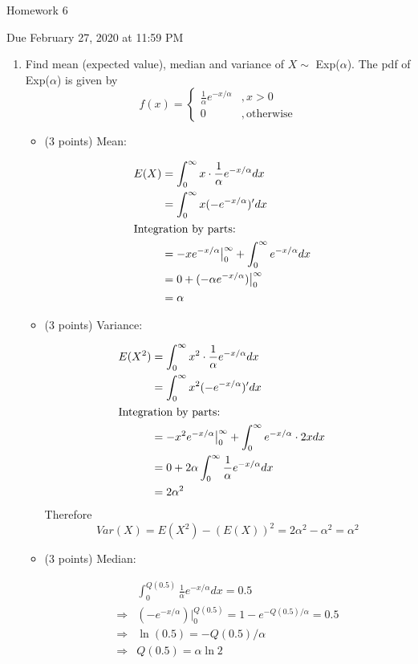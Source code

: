 \documentclass{article}\usepackage[]{graphicx}\usepackage[]{color}
\begin{document}
\begin{center} \LARGE
Homework 6
\end{center}
\begin{center} \Large
Due February 27, 2020 at 11:59 PM 
\end{center}



\begin{enumerate}
	\item  Find mean (expected value), median and variance of $X \sim$ Exp($\alpha$). The pdf of Exp($\alpha$) is given by
	\[f(x) = \begin{cases}
	\frac{1}{\alpha} e^{-x/\alpha}&,x > 0\\
	0 &, \mathrm{otherwise} 
	\end{cases}\]
	
	\begin{itemize}
	\item (3 points) Mean:
	
	\begin{align*}
	E(X) & = \int_{0}^\infty x \cdot \frac{1}{\alpha} e^{-x/\alpha} dx\\
	& = \int_{0}^\infty x (- e^{-x/\alpha})' dx\\
	\intertext{Integration by parts:}
	& = - x e^{-x/\alpha} \big|_0^\infty + \int_{0}^\infty e^{-x/\alpha} dx \quad  \\
	& = 0 + ( - \alpha e^{-x/\alpha})\big|_0^\infty\\
	& = \alpha
	\end{align*}
	
	\item (3 points) Variance:
	
		\begin{align*}
	E(X^2) & = \int_{0}^\infty x^2 \cdot \frac{1}{\alpha} e^{-x/\alpha} dx\\
	& = \int_{0}^\infty x^2 (- e^{-x/\alpha})' dx\\
	\intertext{Integration by parts:}
	& = - x^2 e^{-x/\alpha} \big|_0^\infty + \int_{0}^\infty e^{-x/\alpha} \cdot 2x dx \quad  \\
	& = 0 + 2 \alpha \int_{0}^\infty \frac{1}{\alpha} e^{-x/\alpha} dx\\
	& = 2 \alpha^2
	\end{align*}
	Therefore
	\[Var(X) = E(X^2) - (E(X))^2 = 2 \alpha^2 - \alpha^2 = \alpha^2\]
	
	\item (3 points) Median:
	
	\begin{align*}
	& \int_{0}^{Q(0.5)} \frac{1}{\alpha} e^{-x/\alpha} dx = 0.5\\
	\Rightarrow & (-  e^{-x/\alpha})\big|_0^{Q(0.5)} = 1 - e^{-Q(0.5)/\alpha} = 0.5\\
	\Rightarrow & \ln(0.5) = -Q(0.5)/\alpha\\
	\Rightarrow & Q(0.5) = \alpha \ln 2
	\end{align*}
	

\end{itemize}
\end{enumerate}
\end{document}

